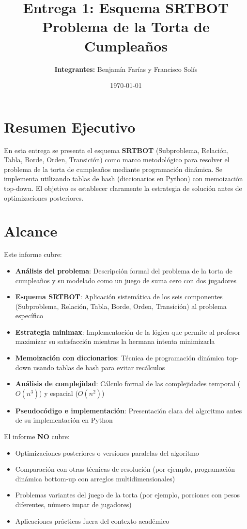 \documentclass[12pt,letterpaper]{article}
\title{\textbf{Entrega 1: Esquema SRTBOT\\Problema de la Torta de Cumpleaños}}
\author{\textbf{Integrantes:} Benjamín Farías y Francisco Solís}
\date{\today}
\begin{document}
\maketitle

\section*{Resumen Ejecutivo}

En esta entrega se presenta el esquema \textbf{SRTBOT} (Subproblema, Relación, Tabla, Borde, Orden, Transición) como marco metodológico para resolver el problema de la torta de cumpleaños mediante programación dinámica. Se implementa utilizando tablas de hash (diccionarios en Python) con memoización top-down. El objetivo es establecer claramente la estrategia de solución antes de optimizaciones posteriores.

\section*{Alcance}

Este informe cubre:

\begin{itemize}
    \item \textbf{Análisis del problema}: Descripción formal del problema de la torta de cumpleaños y su modelado como un juego de suma cero con dos jugadores
    \item \textbf{Esquema SRTBOT}: Aplicación sistemática de los seis componentes (Subproblema, Relación, Tabla, Borde, Orden, Transición) al problema específico
    \item \textbf{Estrategia minimax}: Implementación de la lógica que permite al profesor maximizar su satisfacción mientras la hermana intenta minimizarla
    \item \textbf{Memoización con diccionarios}: Técnica de programación dinámica top-down usando tablas de hash para evitar recálculos
    \item \textbf{Análisis de complejidad}: Cálculo formal de las complejidades temporal ($O(n^3)$) y espacial ($O(n^2)$)
    \item \textbf{Pseudocódigo e implementación}: Presentación clara del algoritmo antes de su implementación en Python
\end{itemize}

El informe \textbf{NO} cubre:

\begin{itemize}
    \item Optimizaciones posteriores o versiones paralelas del algoritmo
    \item Comparación con otras técnicas de resolución (por ejemplo, programación dinámica bottom-up con arreglos multidimensionales)
    \item Problemas variantes del juego de la torta (por ejemplo, porciones con pesos diferentes, número impar de jugadores)
    \item Aplicaciones prácticas fuera del contexto académico
\end{itemize}
\end{document}
